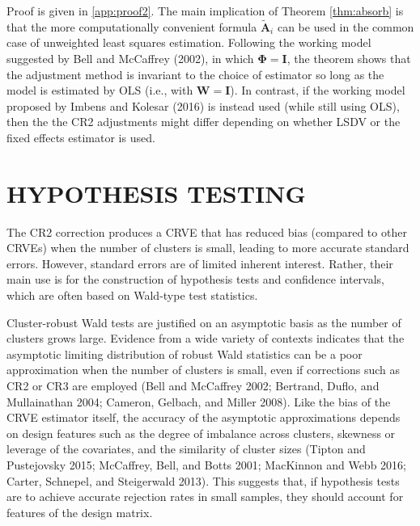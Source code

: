 \documentclass[12pt]{article}
\begin{document}
Proof is given in \ref{app:proof2}. The main implication of Theorem
\ref{thm:absorb} is that the more computationally convenient formula
\(\mathbf{\tilde{A}}_i\) can be used in the common case of unweighted
least squares estimation. Following the working model suggested by Bell
and McCaffrey (2002), in which \(\boldsymbol\Phi = \mathbf{I}\), the
theorem shows that the adjustment method is invariant to the choice of
estimator so long as the model is estimated by OLS (i.e., with
\(\mathbf{W} = \mathbf{I}\)). In contrast, if the working model proposed
by Imbens and Kolesar (2016) is instead used (while still using OLS),
then the the CR2 adjustments might differ depending on whether LSDV or
the fixed effects estimator is used.

\hypertarget{sec:testing}{%
\section{HYPOTHESIS TESTING}\label{sec:testing}}

The CR2 correction produces a CRVE that has reduced bias (compared to
other CRVEs) when the number of clusters is small, leading to more
accurate standard errors. However, standard errors are of limited
inherent interest. Rather, their main use is for the construction of
hypothesis tests and confidence intervals, which are often based on
Wald-type test statistics.

Cluster-robust Wald tests are justified on an asymptotic basis as the
number of clusters grows large. Evidence from a wide variety of contexts
indicates that the asymptotic limiting distribution of robust Wald
statistics can be a poor approximation when the number of clusters is
small, even if corrections such as CR2 or CR3 are employed (Bell and
McCaffrey 2002; Bertrand, Duflo, and Mullainathan 2004; Cameron,
Gelbach, and Miller 2008). Like the bias of the CRVE estimator itself,
the accuracy of the asymptotic approximations depends on design features
such as the degree of imbalance across clusters, skewness or leverage of
the covariates, and the similarity of cluster sizes (Tipton and
Pustejovsky 2015; McCaffrey, Bell, and Botts 2001; MacKinnon and Webb
2016; Carter, Schnepel, and Steigerwald 2013). This suggests that, if
hypothesis tests are to achieve accurate rejection rates in small
samples, they should account for features of the design matrix.
\end{document}
